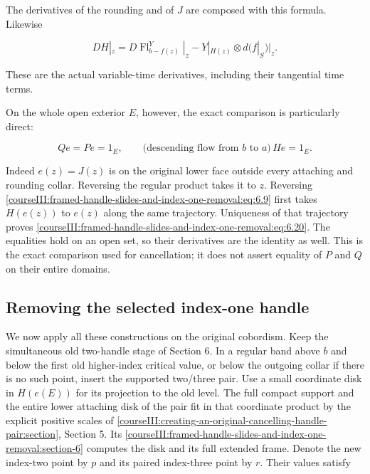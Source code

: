 The derivatives of the rounding and of \(J\) are composed with this formula. Likewise

\begin{equation}
DH|_z=
 D\operatorname{Fl}^Y_{b-f(z)}|_z
           -Y|_{H(z)}\otimes d(f|_S)|_z .
 \label{courseIII:framed-handle-slides-and-index-one-removal:eq:6.19}
\end{equation}

These are the actual variable-time derivatives, including their tangential time terms.

On the whole open exterior \(E\), however, the exact comparison is particularly direct:

\begin{equation}
Qe=Pe=1_E,\qquad
 \bigl(\text{descending flow from }b\text{ to }a\bigr)\,He=1_E .
 \label{courseIII:framed-handle-slides-and-index-one-removal:eq:6.20}
\end{equation}

Indeed \(e(z)=J(z)\) is on the original lower face outside every attaching and rounding collar. Reversing the regular product takes it to \(z\). Reversing \eqref{courseIII:framed-handle-slides-and-index-one-removal:eq:6.9} first takes \(H(e(z))\) to \(e(z)\) along the same trajectory. Uniqueness of that trajectory proves \eqref{courseIII:framed-handle-slides-and-index-one-removal:eq:6.20}. The equalities hold on an open set, so their derivatives are the identity as well. This is the exact comparison used for cancellation; it does not assert equality of \(P\) and \(Q\) on their entire domains.

\subsection{Removing the selected index-one handle}
\label{courseIII:framed-handle-slides-and-index-one-removal:slide-index-one-cancellation}

\label{courseIII:framed-handle-slides-and-index-one-removal:section-7}\label{courseIII:low-index-slides:7}

We now apply all these constructions on the original cobordism. Keep the simultaneous old two-handle stage of Section 6. In a regular band above \(b\) and below the first old higher-index critical value, or below the outgoing collar if there is no such point, insert the supported two/three pair. Use a small coordinate disk in \(H(e(E))\) for its projection to the old level. The full compact support and the entire lower attaching disk of the pair fit in that coordinate product by the explicit positive scales of \cref{courseIII:creating-an-original-cancelling-handle-pair:section}, Section 5. Its \cref{courseIII:framed-handle-slides-and-index-one-removal:section-6} computes the disk and its full extended frame. Denote the new index-two point by \(p\) and its paired index-three point by \(r\). Their values satisfy


